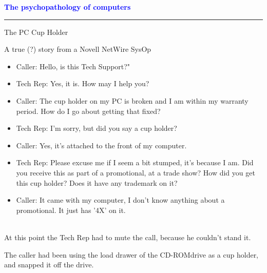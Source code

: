 \documentclass[pdf]{beamer}
\newcommand\tab[1][1cm]{\hspace*{#1}}
\newcommand{\dialogueline}[2]{\begin{dialogue}{#1} #2 \end{dialogue}}
\begin{document}
\begin{frame}
    \textcolor{Blue}{\textbf{\Large{The psychopathology of computers}}}
    \textcolor{red}{\rule{10cm}{1mm}}
    
{\LARGE{{The PC Cup Holder}}}

\vspace{5mm}

    \normalsize{A true (?) story from a Novell NetWire SysOp} \newline
 	\scriptsize
    \begin{itemize}
    	\item[\textcolor{black}{ }] Caller: \qquad \enspace Hello, is this Tech Support?"
        \item[\textcolor{black}{ }] Tech Rep: \quad Yes, it is. How may I help you? 
        \item[\textcolor{black}{ }] Caller: \qquad \enspace The cup holder on my PC is broken and I am within my warranty \tab \qquad \enspace period. How do I go about getting that fixed? 
         \item[\textcolor{black}{ }] Tech Rep: \quad I'm sorry, but did you say a cup holder?
         \item[\textcolor{black}{ }] Caller: \qquad \enspace Yes, it's attached to the front of my computer.
        \item[\textcolor{black}{ }] Tech Rep: \quad Please excuse me if I seem a bit stumped, it's because I am. Did \tab \qquad \enspace you receive this as part of a promotional, at a trade show? How \tab \qquad \enspace did you get this cup holder? Does it have any trademark on it?
        \item[\textcolor{black}{ }] Caller: \qquad \enspace It came with my computer, I don't know anything about a \tab \qquad \enspace promotional. It just has '4X' on it. 
    \end{itemize} \par
    \   \\
    \footnotesize{At this point the Tech Rep had to mute the call, because he couldn't stand it.}\newline
  
    \footnotesize{The caller had been using the load drawer of the CD-ROMdrive as a cup holder, and snapped it off the drive.}
    
    
\end{frame}
\end{document}
